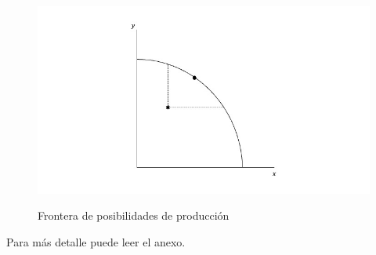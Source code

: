 \begin{figure}[htbp]
    \centering
    \caption{Frontera de posibilidades de producción}
    \includegraphics[width=\textwidth]{Figuras/EQ Frontera de posibilidades de produccion.jpeg}
    \label{fig:diapositiva5}
\end{figure}
Para más detalle puede leer el anexo.
